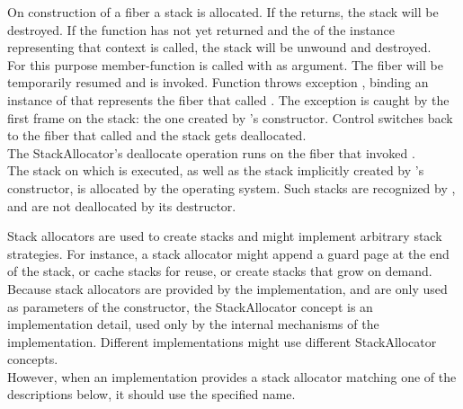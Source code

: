 \label{destruction}

On construction of a fiber a stack is allocated. If the \entryfn\xspace returns,
the stack will be destroyed. If the function has not yet returned and the
 of the \fiber instance representing that context is called,
the stack will be unwound and destroyed.\\

For this purpose member-function \resumewith is called with \unwindfib as
argument. The fiber will be temporarily resumed and \unwindfib is
invoked. Function \unwindfib throws exception \unwindex,
binding an instance of \fiber that represents the fiber that
called \resumewith.
The exception is caught by the first frame on the stack: the one created
by \fiber's constructor. Control switches back to the fiber that
called \dtor and the stack gets deallocated.\\

The StackAllocator's deallocate operation runs on the fiber that invoked
\dtor.\\

The stack on which  is executed, as well as the stack implicitly
created by 's constructor, is allocated by the operating
system. Such stacks are recognized by \fiber, and are not deallocated by its
destructor.


\label{stackalloc}

Stack allocators are used to create stacks and might implement arbitrary stack
strategies. For instance, a stack allocator might append a guard page at the end
of the stack, or cache stacks for reuse, or create stacks that grow on demand.\\

Because stack allocators are provided by the implementation, and are only used
as parameters of the constructor, the StackAllocator concept is an
implementation detail, used only by the internal mechanisms of the
implementation. Different implementations might use different StackAllocator
concepts.\\

However, when an implementation provides a stack allocator matching one of
the descriptions below, it should use the specified name.\\

